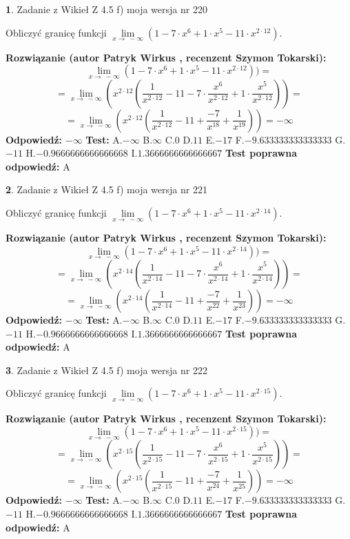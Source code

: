 \documentclass[12pt, a4paper]{article}
\theoremstyle{definition} %
\newtheorem{zad}{}
\newcommand{\zadStart}[1]{\begin{zad}#1\newline}
\newcommand{\zadStop}{\end{zad}}
\newcommand{\rozwStart}[2]{\noindent \textbf{Rozwiązanie (autor #1 , recenzent #2): }\newline}
\newcommand{\rozwStop}{\newline}
\newcommand{\odpStart}{\noindent \textbf{Odpowiedź:}\newline}
\newcommand{\odpStop}{\newline}
\newcommand{\testStart}{\noindent \textbf{Test:}\newline}
\newcommand{\testStop}{\newline}
\newcommand{\kluczStart}{\noindent \textbf{Test poprawna odpowiedź:}\newline}
\newcommand{\kluczStop}{\newline}
\begin{document}
\zadStart{Zadanie z Wikieł Z 4.5 f) moja wersja nr 220}


Obliczyć granicę funkcji  $\lim\limits_{x\to\ -\infty}(1 - 7 \cdot x^{6}+1 \cdot x^{5}- 11 \cdot x^{2\cdot12})$.
\zadStop
\rozwStart{Patryk Wirkus}{Szymon Tokarski}
$$\lim\limits_{x\to\ -\infty}(1 - 7 \cdot x^{6}+1 \cdot x^{5}- 11 \cdot x^{2\cdot12}))=$$
$$=\lim\limits_{x\to\ -\infty}(x^{2\cdot12}(\frac{1}{x^{2\cdot12}}-11 -7 \cdot \frac{x^{6}}{x^{2\cdot12}}+1 \cdot \frac{x^{5}}{x^{2\cdot12}}))=$$
$$=\lim\limits_{x\to\ -\infty}(x^{2\cdot12}(\frac{1}{x^{2\cdot12}}-11 + \frac{-7}{x^{18}}+ \frac{1}{x^{19}}))=-\infty$$
\rozwStop
\odpStart
$-\infty$
\odpStop
\testStart
A.$-\infty$ B.$\infty$ C.$0$ D.$11$ E.$-17$
F.$-9.633333333333333$ G.$-11$
H.$-0.9666666666666668$
I.$1.3666666666666667$
\testStop
\kluczStart
A
\kluczStop



\zadStart{Zadanie z Wikieł Z 4.5 f) moja wersja nr 221}


Obliczyć granicę funkcji  $\lim\limits_{x\to\ -\infty}(1 - 7 \cdot x^{6}+1 \cdot x^{5}- 11 \cdot x^{2\cdot14})$.
\zadStop
\rozwStart{Patryk Wirkus}{Szymon Tokarski}
$$\lim\limits_{x\to\ -\infty}(1 - 7 \cdot x^{6}+1 \cdot x^{5}- 11 \cdot x^{2\cdot14}))=$$
$$=\lim\limits_{x\to\ -\infty}(x^{2\cdot14}(\frac{1}{x^{2\cdot14}}-11 -7 \cdot \frac{x^{6}}{x^{2\cdot14}}+1 \cdot \frac{x^{5}}{x^{2\cdot14}}))=$$
$$=\lim\limits_{x\to\ -\infty}(x^{2\cdot14}(\frac{1}{x^{2\cdot14}}-11 + \frac{-7}{x^{22}}+ \frac{1}{x^{23}}))=-\infty$$
\rozwStop
\odpStart
$-\infty$
\odpStop
\testStart
A.$-\infty$ B.$\infty$ C.$0$ D.$11$ E.$-17$
F.$-9.633333333333333$ G.$-11$
H.$-0.9666666666666668$
I.$1.3666666666666667$
\testStop
\kluczStart
A
\kluczStop



\zadStart{Zadanie z Wikieł Z 4.5 f) moja wersja nr 222}


Obliczyć granicę funkcji  $\lim\limits_{x\to\ -\infty}(1 - 7 \cdot x^{6}+1 \cdot x^{5}- 11 \cdot x^{2\cdot15})$.
\zadStop
\rozwStart{Patryk Wirkus}{Szymon Tokarski}
$$\lim\limits_{x\to\ -\infty}(1 - 7 \cdot x^{6}+1 \cdot x^{5}- 11 \cdot x^{2\cdot15}))=$$
$$=\lim\limits_{x\to\ -\infty}(x^{2\cdot15}(\frac{1}{x^{2\cdot15}}-11 -7 \cdot \frac{x^{6}}{x^{2\cdot15}}+1 \cdot \frac{x^{5}}{x^{2\cdot15}}))=$$
$$=\lim\limits_{x\to\ -\infty}(x^{2\cdot15}(\frac{1}{x^{2\cdot15}}-11 + \frac{-7}{x^{24}}+ \frac{1}{x^{25}}))=-\infty$$
\rozwStop
\odpStart
$-\infty$
\odpStop
\testStart
A.$-\infty$ B.$\infty$ C.$0$ D.$11$ E.$-17$
F.$-9.633333333333333$ G.$-11$
H.$-0.9666666666666668$
I.$1.3666666666666667$
\testStop
\kluczStart
A
\kluczStop
\end{document}
